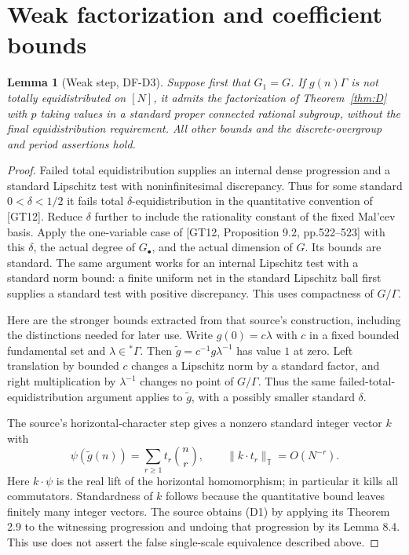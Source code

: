 \documentclass[11pt]{article}
\newtheorem{lemma}[theorem]{Lemma}
\newcommand{\T}{\mathbb T}
\begin{document}
\section{Weak factorization and coefficient bounds}
\begin{lemma}[Weak step, DF-D3]\label{lem:weak}
Suppose first that $G_1=G$. If $g(n)\Gamma$ is not totally equidistributed
on $[N]$, it admits the factorization of Theorem~\ref{thm:D} with $p$ taking
values in a standard proper connected rational subgroup, without the final
equidistribution requirement. All other bounds and the discrete-overgroup
and period assertions hold.
\end{lemma}
\begin{proof}
Failed total equidistribution supplies an internal dense progression and a
standard Lipschitz test with noninfinitesimal discrepancy. Thus for some
standard $0<\delta<1/2$ it fails total $\delta$-equidistribution in the
quantitative convention of [GT12]. Reduce $\delta$ further to include the
rationality constant of the fixed Mal'cev basis. Apply the one-variable case
of [GT12, Proposition 9.2, pp.522--523] with this $\delta$, the actual degree
of $G_\bullet$, and the actual dimension of $G$. Its bounds are standard.
The same argument works for an internal Lipschitz test with a standard norm
bound: a finite uniform net in the standard Lipschitz ball first supplies a
standard test with positive discrepancy. This uses compactness of $G/\Gamma$.

Here are the stronger bounds extracted from that source's construction,
including the distinctions needed for later use. Write $g(0)=c\lambda$
with $c$ in a fixed bounded fundamental set and $\lambda\in{}^*\Gamma$.
Then $\widetilde g=c^{-1}g\lambda^{-1}$ has value $1$ at zero. Left
translation by bounded $c$ changes a Lipschitz norm by a standard factor,
and right multiplication by $\lambda^{-1}$ changes no point of $G/\Gamma$.
Thus the same failed-total-equidistribution argument applies to
$\widetilde g$, with a possibly smaller standard $\delta$.

The source's horizontal-character step gives a nonzero standard integer
vector $k$ with
\[
 \psi(\widetilde g(n))=\sum_{r\geq1}t_r\binom n r,
 \qquad \|k\cdot t_r\|_\T=O(N^{-r}).                         \tag{D1}
\]
Here $k\cdot\psi$ is the real lift of the horizontal homomorphism; in
particular it kills all commutators. Standardness of $k$ follows because the
quantitative bound leaves finitely many integer vectors. The source obtains
(D1) by applying its Theorem 2.9 to the witnessing progression and undoing
that progression by its Lemma 8.4. This use does not assert the false
single-scale equivalence described above.


\end{proof}
\end{document}
